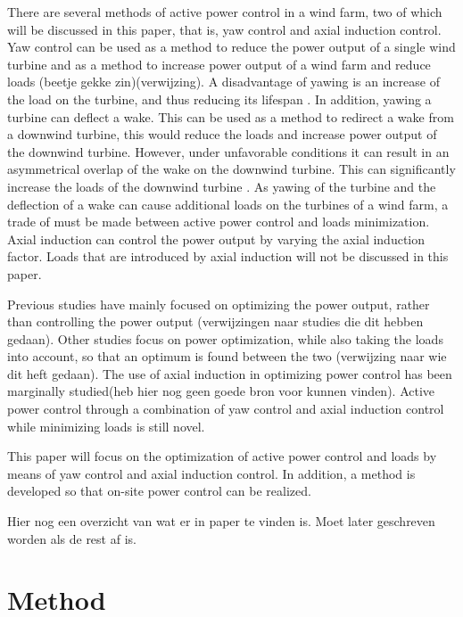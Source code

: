 \documentclass[twoside,twocolumn]{article}
\begin{document}
There are several methods of active power control in a wind farm, two of which will be discussed in this paper, that is, yaw control and axial induction control. Yaw control can be used as a method to reduce the power output of a single wind turbine and as a method to increase power output of a wind farm and reduce loads (beetje gekke zin)(verwijzing). A disadvantage of yawing is an increase of the load on the turbine, and thus reducing its lifespan \cite{Zalkind2016,Kanev2017}. In addition, yawing a turbine can deflect a wake. This can be used as a method to redirect a wake from a downwind turbine, this would reduce the loads and increase power output of the downwind turbine. However, under unfavorable conditions it can result in an asymmetrical overlap of the wake on the downwind turbine. This can significantly increase the loads of the downwind turbine \cite{Wilson2017,Dijk2016,Bastankhah2016}. As yawing of the turbine and the deflection of a wake can cause additional loads on the turbines of a wind farm, a trade of must be made between active power control and loads minimization. Axial induction can control the power output by varying the axial induction factor. Loads that are introduced by axial induction will not be discussed in this paper. 

Previous studies have mainly focused on optimizing the power output, rather than controlling the power output (verwijzingen naar studies die dit hebben gedaan).  Other studies focus on power optimization, while also taking the loads into account, so that an optimum is found between the two (verwijzing naar wie dit heft gedaan). The use of axial induction in optimizing power control has been marginally studied(heb hier nog geen goede bron voor kunnen vinden). Active power control through a combination of yaw control and axial induction control while minimizing loads is still novel.

This paper will focus on the optimization of active power control and loads by means of yaw control and axial induction control. In addition, a method is developed so that on-site power control can be realized.
	
Hier nog een overzicht van wat er in paper te vinden is. Moet later geschreven worden als de rest af is.


	
	\section{Method}
\label{sec:method}
	
\end{document}
